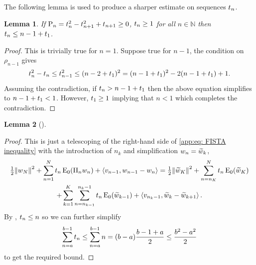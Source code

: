 \documentclass[10pt,a4paper,onecolumn]{article}
\numberwithin{equation}{section}
\newtheorem{lemma}{Lemma}[section]\newtheorem{example}{Example}[section]
\let\F\mathds\let\C\mathcal\newcommand{\R}{\F{R}}\newcommand{\A}{\C{A}}
\newcommand{\norm}[1]{{\left\lVert #1 \right\rVert}}
\newcommand{\IP}[2]{\left\langle #1,#2 \right\rangle}\newcommand{\ip}[2]{#1 \vcenter{\hbox{\resizebox{6pt}{!}{\ensuremath\cdot}}} #2}
\newcommand{\op}[1]{\operatorname{#1}}\newcommand{\overtext}[2]{\stackrel{\text{#1}}{#2}}
\newcommand*{\Func}[1]{%
	\IfEqCase{#1}{%
		{0}{\op{E}}%
		{1}{\op{F}}%
		{2}{\op{G}}%
		{3}{\op{H}}%
	}[\op{F}#1]%
}
\newcommand*{\varf}[1]{%
	\IfEqCase{#1}{%
		{0}{u}%
		{1}{v}%
		{2}{w}%
	}[u#1]%
}
\newcommand*{\vart}[1]{%
	\IfEqCase{#1}{%
		{0}{s}%
		{1}{t}%
	}[t#1]%
}
\newcommand*{\vars}[1]{%
	\IfEqCase{#1}{%
		{0}{\alpha}%
		{1}{\beta}%
		{2}{\gamma}%
		{3}{a}%
		{4}{b}%
		{5}{c}%
	}[k#1]%
}
\begin{document}
\noindent The following lemma is used to produce a sharper estimate on sequences $\vart1_n$.
\begin{lemma}\label{app: tn upper bound}
	If $\rho_n=\vart1_{n}^2-\vart1_{n+1}^2+\vart1_{n+1}\geq0$, $\vart1_n\geq 1$ for all $n\in\F N$ then $\vart1_n\leq n-1 +\vart1_1$.
\end{lemma}
\begin{proof}
	This is trivially true for $n=1$. Suppose true for $n-1$, the condition on $\rho_{n-1}$ gives
	\begin{equation}
		\vart1_n^2 -\vart1_n \leq \vart1_{n-1}^2 \leq (n-2+\vart1_1)^2 = (n-1+\vart1_1)^2 -2(n-1+\vart1_1) + 1.
	\end{equation}
	Assuming the contradiction, if $\vart1_n> n-1+\vart1_1$ then the above equation simplifies to $n-1+\vart1_1 < 1$. However, $\vart1_1\geq 1$ implying that $n<1$ which completes the contradiction.
\end{proof}



\begin{lemma}[]\label{app:thm: mini exponential FISTA convergence}
\end{lemma}
\begin{proof}
	This is just a telescoping of the right-hand side of \eqref{app:eq: FISTA inequality} with the introduction of $n_k$ and simplification $\varf2_n = \tilde{\varf2}_k$,
	\begin{multline}
		\tfrac12\norm{\varf2_N}^2 + \sum^N_{n=1} \vart1_n\Func0_0(\Pi_n\varf2_n) + \IP{\varf1_{n-1}}{\varf2_{n-1}-\varf2_n} = \tfrac12\norm{\tilde{\varf2}_K}^2 + \sum_{n=n_K}^N\vart1_n\Func0_0(\tilde{\varf2}_K) 
		\\+ \sum_{k=1}^K\sum_{n=n_{k-1}}^{n_k-1}\vart1_n\Func0_0(\tilde{\varf2}_{k-1}) 
		+ \IP{\varf1_{n_k-1}}{\tilde{\varf2}_k-\tilde{\varf2}_{k+1}}.
	\end{multline}
	By , $\vart1_n\leq n$ so we can further simplify
	$$\sum_{n=\vars3}^{\vars4-1}\vart1_n \leq \sum_{n=\vars3}^{\vars4-1}n = (\vars4-\vars3)\frac{\vars4-1+\vars3}{2} \leq \frac{\vars4^2-\vars3^2}{2}$$
	to get the required bound.
\end{proof}
\end{document}
